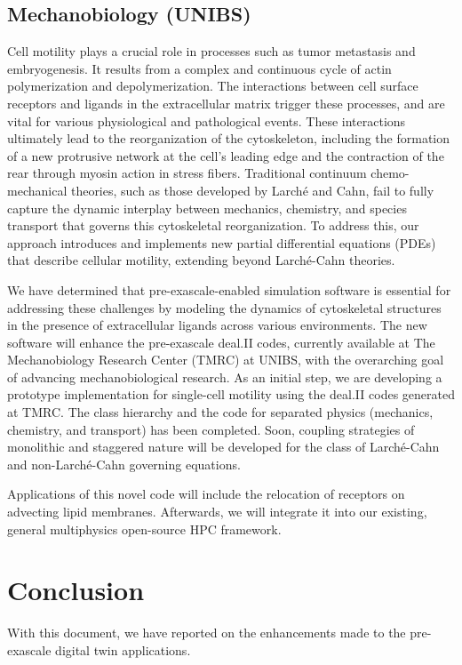 \documentclass[a4paper,12pt]{article}
\begin{document}
\subsection{Mechanobiology (UNIBS)}
Cell motility plays a crucial role in processes such as tumor metastasis and embryogenesis.
It results from a complex and continuous cycle of actin polymerization and depolymerization.
The interactions between cell surface receptors and ligands in the extracellular matrix trigger these processes, and are vital for various physiological and pathological events.
These interactions ultimately lead to the reorganization of the cytoskeleton, including the formation of a new protrusive network at the cell's leading edge and the contraction of the rear through myosin action in stress fibers.
Traditional continuum chemo-mechanical theories, such as those developed by Larché and Cahn, fail to fully capture the dynamic interplay between mechanics, chemistry, and species transport that governs this cytoskeletal reorganization.
To address this, our approach introduces and implements new partial differential equations (PDEs) that describe cellular motility, extending beyond Larché-Cahn theories.

We have determined that pre-exascale-enabled simulation software is essential for addressing these challenges by modeling the dynamics of cytoskeletal structures in the presence of extracellular ligands across various environments.
The new software will enhance the pre-exascale deal.II codes, currently available at The Mechanobiology Research Center (TMRC) at UNIBS, with the overarching goal of advancing mechanobiological research.
As an initial step, we are developing a prototype implementation for single-cell motility using the deal.II codes generated at TMRC.
The class hierarchy and the code for separated physics (mechanics, chemistry, and transport) has been completed.
Soon, coupling strategies of monolithic and staggered nature will be developed for the class of Larché-Cahn and non-Larché-Cahn governing equations.

Applications of this novel code will include the relocation of receptors on advecting lipid membranes.
Afterwards, we will integrate it into our existing, general multiphysics open-source HPC framework.

\newpage

\section{{Conclusion}} \label{sec:conclusion}

With this document, we have reported on the enhancements made to the pre-exascale digital twin applications.

\label{MyLastPage}
\end{document}
